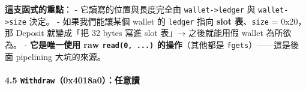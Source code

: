 \documentclass[10pt,a4paper]{article}
\begin{document}
\textbf{這支函式的重點}： - 它讀寫的位置與長度完全由
\texttt{wallet-\allowbreak{}\textgreater{}\allowbreak{}ledger} 與
\texttt{wallet-\allowbreak{}\textgreater{}\allowbreak{}size} 決定。 - 如果我們能讓某個 wallet 的
\texttt{ledger} 指向 \textbf{slot 表}、\texttt{size} = 0x20， 那 Deposit
就變成「把 32 bytes 寫進 slot 表」→ 之後就能用假 wallet 為所欲為。 -
\textbf{它是唯一使用 raw \texttt{read(0,\allowbreak{}\ \allowbreak{}...)} 的操作}（其他都是
\texttt{fgets}）------這是後面 pipelining 大坑的來源。

\paragraph{\texorpdfstring{4.5
\texttt{Withdraw}（0x4018a0）：\textbf{任意讀}}{4.5 Withdraw（0x4018a0）：任意讀}}\label{withdraw0x4018a0ux4efbux610fux8b80}
\end{document}
